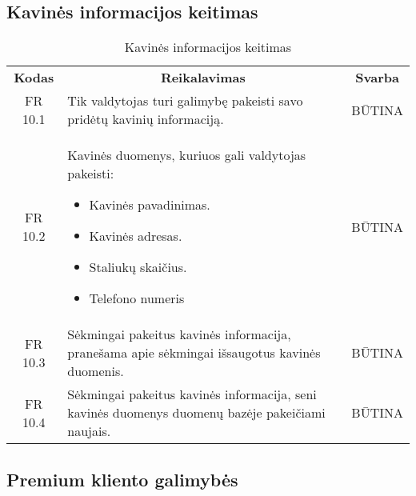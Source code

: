 \documentclass{VUMIFPSkursinis}
\begin{document}
\subsection{Kavinės informacijos keitimas}
\begin{center}
	\begin{table}[H]
	\begin{tabular}{|p{2cm}|p{}|p{}|}
	\hline
	    \rowcolor{lightgray}
		\multicolumn{3}{|c|}{Kavinės informacijos keitimas}\\
		
	\hline
		\multicolumn{1}{|c|}{{\bfseries Kodas}}&
		\multicolumn{1}{|c|}{{\bfseries Reikalavimas}}&
		\multicolumn{1}{|c|}{{\bfseries Svarba}}\\
	\hline 	
		\multicolumn{1}{|c|}{FR 10.1}&
		{Tik valdytojas turi galimybę pakeisti savo pridėtų kavinių informaciją.}&
		\multicolumn{1}{|c|}{BŪTINA}\\
	
	\hline 	
		\multicolumn{1}{|c|}{FR 10.2}&
		{Kavinės duomenys, kuriuos gali valdytojas pakeisti:
		\begin{itemize}
			\item Kavinės pavadinimas.
			\item Kavinės adresas.
			\item Staliukų skaičius.
			\item Telefono numeris
		\end{itemize}}&
		\multicolumn{1}{|c|}{BŪTINA}\\
	
	\hline 	
		\multicolumn{1}{|c|}{FR 10.3}&
		{Sėkmingai pakeitus kavinės informacija, pranešama apie sėkmingai išsaugotus kavinės duomenis.}&
		\multicolumn{1}{|c|}{BŪTINA}\\
	
	\hline 	
		\multicolumn{1}{|c|}{FR 10.4}&
		{Sėkmingai pakeitus kavinės informacija, seni kavinės duomenys duomenų bazėje pakeičiami naujais.}&
		\multicolumn{1}{|c|}{BŪTINA}\\
	
	\hline  
	
	
	\end{tabular}
	\caption{Kavinės informacijos keitimas}
	\label{table:Kavinėsinformacijoskeitimas}	
	\end{table}

\end{center}

\subsection{Premium kliento galimybės}
\end{document}
